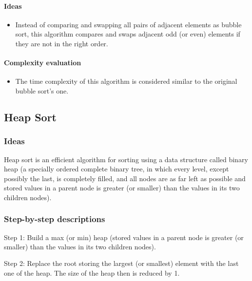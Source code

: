 \documentclass{article}
\newcommand\tab[1][0.5cm]{\hspace*{#1}}
\begin{document}
\paragraph{\tab Ideas}

\begin{itemize}
    \item Instead of comparing and swapping all pairs of adjacent elements as bubble sort, this algorithm compares and swaps adjacent odd (or even) elements if they are not in the right order.
    
\end{itemize}

\paragraph{\tab Complexity evaluation}

\begin{itemize}
    \item The time complexity of this algorithm is considered similar to the original bubble sort's one.
\end{itemize}

\pagebreak


\subsection{Heap Sort}

\subsubsection{Ideas}

\tab Heap sort is an efficient algorithm for sorting using a data structure called binary heap (a specially ordered complete binary tree, in which every level, except possibly the last, is completely filled, and all nodes are as far left as possible and stored values in a parent node is greater (or smaller) than the values in its two children nodes).

\subsubsection{Step-by-step descriptions}

\tab Step 1: Build a max (or min) heap (stored values in a parent node is greater (or smaller) than the values in its two children nodes).
\smallskip

Step 2: Replace the root storing the largest (or smallest) element with the last one of the heap. The size of the heap then is reduced by 1.
\smallskip
\end{document}
